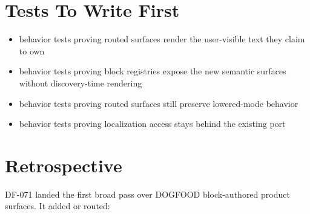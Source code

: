 \section{Tests To Write First}\label{record-111-tests-to-write-first}

\begin{itemize}
\tightlist
\item
  behavior tests proving routed surfaces render the user-visible text they claim to own
\item
  behavior tests proving block registries expose the new semantic surfaces without discovery-time rendering
\item
  behavior tests proving routed surfaces still preserve lowered-mode behavior
\item
  behavior tests proving localization access stays behind the existing port
\end{itemize}

\section{Retrospective}\label{record-111-retrospective}

DF-071 landed the first broad pass over DOGFOOD block-authored product surfaces. It added or routed:

